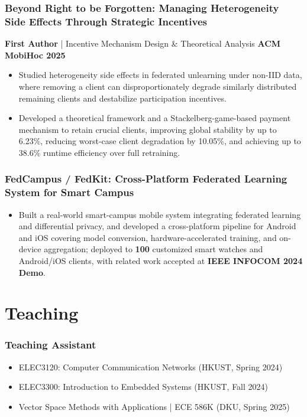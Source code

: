 \documentclass[10pt,a4paper]{article}
\begin{document}
\subsubsection*{\color{itemcolor}Beyond Right to be Forgotten: Managing Heterogeneity Side Effects Through Strategic Incentives}
\noindent\textbf{\color{sectioncolor}First Author} | Incentive Mechanism Design \& Theoretical Analysis \hfill \color{accentcolor}\textbf{ACM MobiHoc 2025}
\begin{itemize}[leftmargin=*]
    \item Studied heterogeneity side effects in federated unlearning under non-IID data, where removing a client can disproportionately degrade similarly distributed remaining clients and destabilize participation incentives.
    \item Developed a theoretical framework and a Stackelberg-game-based payment mechanism to retain crucial clients, improving global stability by up to 6.23\%, reducing worst-case client degradation by 10.05\%, and achieving up to 38.6\% runtime efficiency over full retraining.
\end{itemize}

\subsubsection*{\color{itemcolor}FedCampus / FedKit: Cross-Platform Federated Learning System for Smart Campus}
\begin{itemize}[leftmargin=*]
    \item Built a real-world smart-campus mobile system integrating federated learning and differential privacy, and developed a cross-platform pipeline for Android and iOS covering model conversion, hardware-accelerated training, and on-device aggregation; deployed to \textbf{100} customized smart watches and Android/iOS clients, with related work accepted at \textbf{IEEE INFOCOM 2024 Demo}.
\end{itemize}

\section*{\color{sectioncolor}Teaching}
\subsubsection*{\color{itemcolor}Teaching Assistant}
\begin{itemize}[leftmargin=*]
    \item ELEC3120: Computer Communication Networks (HKUST, Spring 2024)
    \item ELEC3300: Introduction to Embedded Systems (HKUST, Fall 2024)
    \item Vector Space Methods with Applications | ECE 586K (DKU, Spring 2025)
\end{itemize}
\end{document}
